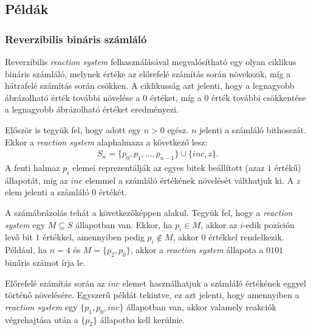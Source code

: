 \documentclass[12pt]{article}
\theoremstyle{definition}
\theoremstyle{remark}
\theoremstyle{plain}
\begin{document}
    \subsection*{Példák}

    \subsubsection*{Reverzibilis bináris számláló}

    Reverzibilis \textit{reaction system} felhasználásával megvalósítható egy olyan ciklikus bináris számláló, melynek értéke az előrefelé számítás során növekszik, míg a hátrafelé számítás során csökken. A ciklikusság azt jelenti, hogy a legnagyobb ábrázolható érték további növelése a $0$ értéket, míg a $0$ érték további csökkentése a legnagyobb ábrázolható értéket eredményezi.

    Először is tegyük fel, hogy adott egy $n > 0$ egész. $n$ jelenti a számláló bithosszát. Ekkor a \textit{reaction system} alaphalmaza a következő lesz:
    \begin{align*}
        S_{n} = \{ p_{0}, p_{1}, \ldots, p_{n - 1}\} \cup \{ \textit{inc}, z \}.
    \end{align*}
    A fenti halmaz $p_{i}$ elemei reprezentálják az egyes bitek beállított (azaz $1$ értékű) állapotát, míg az $\textit{inc}$ elemmel a számláló értékének növelését válthatjuk ki. A $z$ elem jelenti a számláló $0$ értékét.

    A számábrázolás tehát a következőképpen alakul. Tegyük fel, hogy a \textit{reaction system} egy $M \subseteq S$ állapotban van. Ekkor, ha $p_{i} \in M$, akkor az $i$-edik pozíción levő bit $1$ értékkel, amennyiben pedig $p_{i} \notin M$, akkor $0$ értékkel rendelkezik. Például, ha $n = 4$ és $M = \{p_{2}, p_{0}\}$, akkor a \textit{reaction system} állapota a $0101$ bináris számot írja le.
    
    Előrefelé számítás során az $\textit{inc}$ elemet használhatjuk a számláló értékének eggyel történő növelésére. Egyszerű példát tekintve, ez azt jelenti, hogy amennyiben a \textit{reaction system} egy $\{p_{1}, p_{0}, \textit{inc}\}$ állapotban van, akkor valamely reakciók végrehajtása után a $\{ p_{2} \}$ állapotba kell kerülnie.
\end{document}
